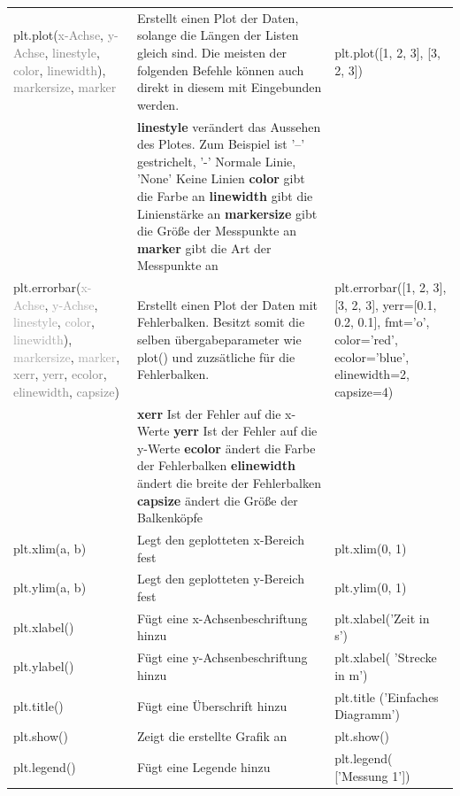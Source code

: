 \documentclass[a4paper,12pt]{article}
\begin{document}
\begin{center}
\begin{tabular}{|p{3cm}|p{8cm}|p{3cm}|}
\hline
plt.plot(\textcolor{gray}{x-Achse}, \textcolor{gray}{y-Achse}, \textcolor{gray}{linestyle}, \textcolor{gray}{color}, \textcolor{gray}{linewidth}), \textcolor{gray}{markersize}, \textcolor{gray}{marker} & Erstellt einen Plot der Daten, solange die Längen der Listen gleich sind. Die meisten der folgenden Befehle können auch direkt in diesem mit Eingebunden werden. & plt.plot([1, 2, 3], [3, 2, 3]) \\
& \textbf{linestyle} verändert das Aussehen des Plotes. Zum Beispiel ist '--' gestrichelt, '-' Normale Linie, 'None' Keine Linien \newline{}
\textbf{color} gibt die Farbe an \newline{}
\textbf{linewidth} gibt die Linienstärke an \newline{}
\textbf{markersize} gibt die Größe der Messpunkte an \newline{}
\textbf{marker} gibt die Art der Messpunkte an & \\
\hline
plt.errorbar(\textcolor{darkgray}{x-Achse}, \textcolor{darkgray}{y-Achse}, \textcolor{darkgray}{linestyle}, \textcolor{darkgray}{color}, \textcolor{darkgray}{linewidth}), \textcolor{darkgray}{markersize}, \textcolor{darkgray}{marker}, \textcolor{gray}{xerr}, \textcolor{gray}{yerr}, \textcolor{gray}{ecolor}, \textcolor{gray}{elinewidth}, \textcolor{gray}{capsize}) & Erstellt einen Plot der Daten mit Fehlerbalken. Besitzt somit die selben übergabeparameter wie plot() und zuzsätliche für die Fehlerbalken. & plt.errorbar([1, 2, 3], [3, 2, 3], yerr=[0.1, 0.2, 0.1], fmt='o', color='red', ecolor='blue', elinewidth=2, capsize=4) \\
& \textbf{xerr} Ist der Fehler auf die x-Werte \newline{}
\textbf{yerr} Ist der Fehler auf die y-Werte \newline{}
\textbf{ecolor} ändert die Farbe der Fehlerbalken \newline{}
\textbf{elinewidth} ändert die breite der Fehlerbalken \newline{}
\textbf{capsize} ändert die Größe der Balkenköpfe & \\
\hline
plt.xlim(a, b) & Legt den geplotteten x-Bereich fest & plt.xlim(0, 1) \\
\hline
plt.ylim(a, b) & Legt den geplotteten y-Bereich fest & plt.ylim(0, 1) \\
\hline
plt.xlabel() & Fügt eine x-Achsenbeschriftung hinzu & plt.xlabel('Zeit in s') \\
\hline
plt.ylabel() & Fügt eine y-Achsenbeschriftung hinzu & plt.xlabel( 'Strecke in m') \\
\hline
plt.title() & Fügt eine Überschrift hinzu & plt.title \newline{} ('Einfaches Diagramm') \\
\hline
plt.show() & Zeigt die erstellte Grafik an & plt.show() \\
\hline
plt.legend() & Fügt eine Legende hinzu & plt.legend( ['Messung 1']) \\
\hline
\end{tabular}
\end{center}
\end{document}

